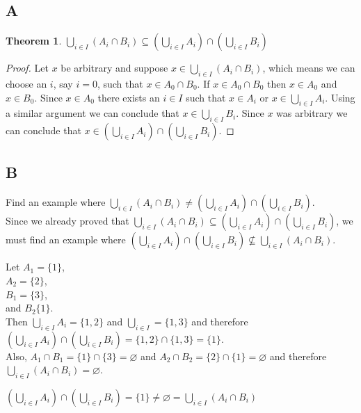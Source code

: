 \documentclass{article}
\newtheorem*{theorem}{Theorem}  %
\begin{document}
\subsection*{A}
\begin{theorem} $\bigcup_{i \in I} (A_{i} \cap B_{i} ) \subseteq ( \bigcup_{i \in I} A_{i} ) \cap ( \bigcup_{i \in I} B_{i} )$
\end{theorem}
\begin{proof}
Let $x$ be arbitrary and suppose $x \in \bigcup_{i \in I} ( A_{i} \cap B_{i} )$, which means we can choose an $i$, say $i = 0$, such that $x \in A_{0} \cap B_{0}$. If $x \in A_{0} \cap B_{0}$ then $x \in A_{0}$ and $x \in B_{0}$. Since $x \in A_{0}$ there exists an $i \in I$ such that $x \in A_{i}$ or $x \in \bigcup_{i \in I} A_{i}$. Using a similar argument we can conclude that $x \in \bigcup_{i \in I} B_{i}$. Since $x$ was arbitrary we can conclude that $x \in (\bigcup_{i \in I} A_{i}) \cap (\bigcup_{i \in I} B_{i})$.
\end{proof}

\subsection*{B}
Find an example where $\bigcup_{i \in I} ( A_{i} \cap B_{i} ) \neq ( \bigcup_{i \in I} A_{i} ) \cap ( \bigcup_{i \in I} B_{i} )$. \\

Since we already proved that $\bigcup_{i \in I} (A_{i} \cap B_{i} ) \subseteq ( \bigcup_{i \in I} A_{i} ) \cap ( \bigcup_{i \in I} B_{i} )$, we must find an example where $( \bigcup_{i \in I} A_{i} ) \cap ( \bigcup_{i \in I} B_{i} ) \nsubseteq \bigcup_{i \in I} (A_{i} \cap B_{i} )$. \\

\begin{flushleft}
Let $A_{1} = \{ 1 \}$, \\
$A_{2} = \{ 2 \}$, \\
$B_{1} = \{ 3 \}$, \\
and $B_{2} \{ 1 \}$. \\

\vspace{5mm} 
Then $\bigcup_{i \in I} A_{i} = \{ 1, 2 \}$ and $\bigcup_{i \in I} = \{ 1, 3 \}$ and therefore \\
$( \bigcup_{i \in I} A_{i} ) \cap ( \bigcup_{i \in I} B_{i} ) = \{1, 2 \} \cap \{ 1, 3 \} = \{ 1 \}$. \\

\vspace{5mm}
Also, $A_{1} \cap B_{1} = \{1 \} \cap \{3 \} = \varnothing$ and $A_{2} \cap B_{2} = \{2 \} \cap \{ 1 \} = \varnothing$ and therefore \\
$ \bigcup_{i \in I} ( A_{i} \cap B_{i} ) = \varnothing$.

\vspace{5mm}
$( \bigcup_{i \in I} A_{i} ) \cap ( \bigcup_{i \in I} B_{i} ) = \{ 1 \} \neq \varnothing = \bigcup_{i \in I} ( A_{i} \cap B_{i} )$
\end{flushleft}
\end{document}
